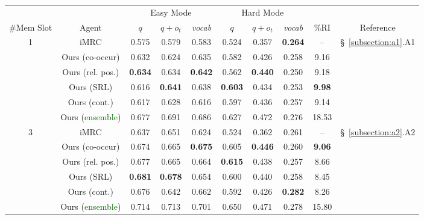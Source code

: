 \documentclass[11pt]{article}
\newcommand{\imrc}{iMRC\xspace}
\newcommand{\clg}{\cellcolor{lightgray}}
\newcommand{\cly}{\cellcolor{lightyellow}}
\begin{document}
\begin{table*}[t!]
    \centering
    \small
    \begin{tabular}{c|c|ccc|ccc|c|c}
        \toprule
        && \multicolumn{3}{c|}{Easy Mode} & \multicolumn{3}{c|}{Hard Mode} & & \\
        \#Mem Slot&Agent & $q$ & $q + o_t$ & \textit{vocab} & $q$ & $q + o_t$ & \textit{vocab} & \%RI & Reference\\
        \hline
        \multirow{6}{*}{1} & \clg\imrc \citep{yuan2020imrc}      &  \clg0.575 & \clg0.579 & \clg0.583 & \clg0.524 & \clg0.357 & \clg\textbf{0.264} & \clg-- & \multirow{6}{*}{\S~\ref{subsection:a1}.A1}\\
        &Ours (co-occur)          &  \cly0.632 & \cly0.624 & \cly0.635 & \cly0.582 & \cly0.426 & 0.258 & \cly9.16 & \\
        &Ours (rel. pos.)         &  \cly\textbf{0.634} & \cly0.634 & \cly\textbf{0.642} & \cly0.562 & \cly\textbf{0.440} & 0.250 & \cly9.18 & \\
        &Ours (SRL)               &  \cly0.616 & \cly\textbf{0.641} & \cly0.638 & \cly\textbf{0.603} & \cly0.434 & 0.253 & \cly\textbf{9.98} & \\
        &Ours (cont.)             &  \cly0.617 & \cly0.628 & \cly0.616 & \cly0.597 & \cly0.436 & 0.257 & \cly9.14 & \\
        &Ours (\textcolor{darkgreen}{ensemble})          &  \cly0.677 & \cly0.691 & \cly0.686 & \cly0.627 & \cly0.472 & \cly0.276 & \cly18.53 & \\
        \hline
        \multirow{6}{*}{3} &\clg\imrc \citep{yuan2020imrc}      &  \clg0.637 & \clg0.651 & \clg0.624 & \clg0.524 & \clg0.362 & \clg0.261 & \clg-- & \multirow{6}{*}{\S~\ref{subsection:a2}.A2}\\
        &Ours (co-occur)          &  \cly0.674 & \cly0.665 & \cly\textbf{0.675} & \cly0.605 & \cly\textbf{0.446} & 0.260 & \cly\textbf{9.06} & \\
        &Ours (rel. pos.)         &  \cly0.677 & \cly0.665 & \cly0.664 & \cly\textbf{0.615} & \cly0.438 & 0.257 & \cly8.66 & \\
        &Ours (SRL)               &  \cly\textbf{0.681} & \cly\textbf{0.678} & \cly0.654 & \cly0.600 & \cly0.440 & 0.258 & \cly8.45 & \\
        &Ours (cont.)             &  \cly0.676 & \cly0.642 & \cly0.662 & \cly0.592 & \cly0.426 & \cly\textbf{0.282} & \cly8.26 & \\
        & Ours (\textcolor{darkgreen}{ensemble})         &  \cly0.714 & \cly0.713 & \cly0.701 & \cly0.650 & \cly0.471 & \cly0.278 & \cly15.80 & \\

\end{tabular}
\end{table*}
\end{document}
